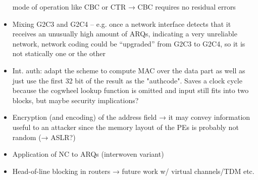 \begin{itemize}
        mode of operation like CBC or CTR → CBC requires no residual errors
    \item Mixing G2C3 and G2C4 -- e.g. once a network interface detects that it receives an unusually high amount of ARQs, indicating a very
        unreliable network, network coding could be \enquote{upgraded} from G2C3 to G2C4, so it is not statically one or the other
    \item Int. auth: adapt the scheme to compute MAC over the data part as well as just use the first 32 bit of the result as the "authcode". Saves a
        clock cycle because the cogwheel lookup function is omitted and input still fits into two blocks, but maybe security implications?
    \item Encryption (and encoding) of the address field → it may convey information useful to an attacker since the memory layout of the PEs is probably not random
        (→ ASLR?)
    \item Application of NC to ARQs (interwoven variant)
    \item Head-of-line blocking in routers → future work w/ virtual channels/TDM etc.
\end{itemize}
